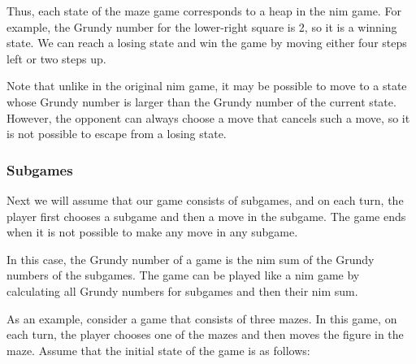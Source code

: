 Thus, each state of the maze game
corresponds to a heap in the nim game.
For example, the Grundy number for
the lower-right square is 2,
so it is a winning state.
We can reach a losing state and
win the game by moving
either four steps left or
two steps up.

Note that unlike in the original nim game,
it may be possible to move to a state whose
Grundy number is larger than the Grundy number
of the current state.
However, the opponent can always choose a move
that cancels such a move, so it is not possible
to escape from a losing state.

\subsubsection{Subgames}

Next we will assume that our game consists
of subgames, and on each turn, the player
first chooses a subgame and then a move in the subgame.
The game ends when it is not possible to make any move
in any subgame.

In this case, the Grundy number of a game
is the nim sum of the Grundy numbers of the subgames.
The game can be played like a nim game by calculating
all Grundy numbers for subgames and then their nim sum.

As an example, consider a game that consists
of three mazes.
In this game, on each turn, the player chooses one
of the mazes and then moves the figure in the maze.
Assume that the initial state of the game is as follows:

